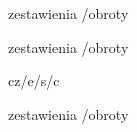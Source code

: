 \documentclass[polish,a4paper,11pt,oneside]{article}
\begin{document}
zestawienia /obroty

\prefixing
zestawienia /obroty

cz/e/s/c

\nonprefixing
zestawienia /obroty
\end{document}
